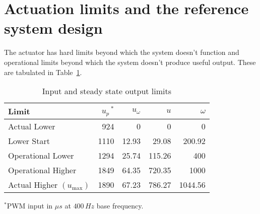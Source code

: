 \section{Actuation limits and the reference system design}
The actuator has hard limits beyond which the system doesn't function and
operational limits beyond which the system doesn't produce useful output. These are tabulated in Table~\ref{tab::actuator_limits}.
\begin{table}[h]
    \caption{Input and steady state output limits}
    \begin{center}
    \begin{tabular}{l r r r r}
        \hline \hline
        Limit & $u_p \,^*$ & $u_{\omega}$ & $u$ & $\omega$ \\ \hline
        Actual Lower         & 924  & 0     & 0        & 0\\
        Lower Start          & 1110 & 12.93 & 29.08    & 200.92 \\
        Operational Lower    & 1294 & 25.74 & 115.26   & 400 \\
        Operational Higher   & 1849 & 64.35 & 720.35   & 1000\\
        Actual Higher $(u_{\max})$& 1890 & 67.23 & 786.27   &  1044.56\\
        \hline \hline
    \end{tabular}
    \label{tab::actuator_limits}
    \end{center}
    $^*$PWM input in $\mu s$ at $400 \, Hz$ base frequency.
\end{table}


